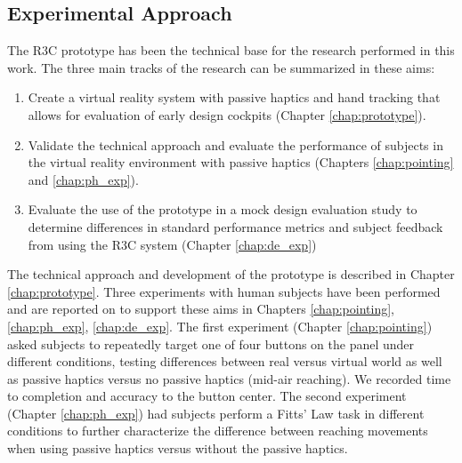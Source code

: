 \subsection{Experimental Approach}

The R3C prototype has been the technical base for the research performed in this work.
The three main tracks of the research can be summarized in these aims:
\begin{enumerate}
    \item Create a virtual reality system with passive haptics and hand tracking that allows for evaluation of early design cockpits (Chapter \ref{chap:prototype}).
    \item Validate the technical approach and evaluate the performance of subjects in the virtual reality environment with passive haptics (Chapters \ref{chap:pointing} and \ref{chap:ph_exp}).
    \item Evaluate the use of the prototype in a mock design evaluation study to determine differences in standard performance metrics and subject feedback from using the R3C system (Chapter \ref{chap:de_exp})
\end{enumerate}
The technical approach and development of the prototype is described in Chapter \ref{chap:prototype}.
Three experiments with human subjects have been performed and are reported on to support these aims in Chapters \ref{chap:pointing}, \ref{chap:ph_exp}, \ref{chap:de_exp}.
The first experiment (Chapter \ref{chap:pointing}) asked subjects to repeatedly target one of four buttons on the panel under different conditions, testing differences between real versus virtual world as well as passive haptics versus no passive haptics (mid-air reaching).
We recorded time to completion and accuracy to the button center.
The second experiment (Chapter \ref{chap:ph_exp}) had subjects perform a Fitts' Law task in different conditions to further characterize the difference between reaching movements when using passive haptics versus without the passive haptics.
